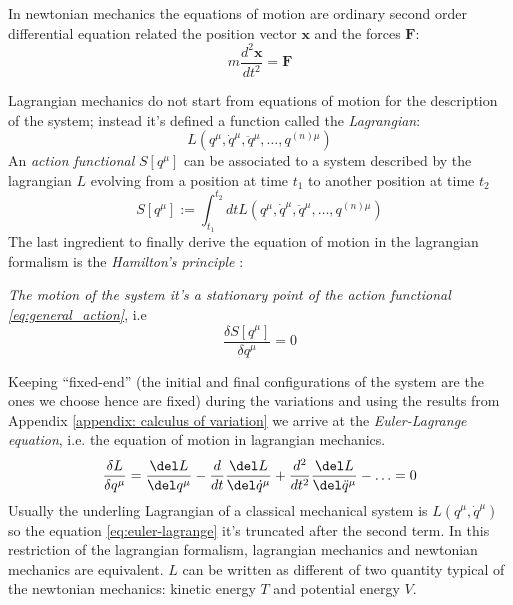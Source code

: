 In newtonian mechanics the equations of motion are ordinary second order differential
equation related the position vector $\bm{x}$ and the forces $\bm{F}$:
\begin{equation*}
    m \frac{d^2\bm{x}}{dt^2} = \bm{F}
\end{equation*}

Lagrangian mechanics do not start from equations of motion for the description of the
system; instead it's defined a function called the \emph{Lagrangian}:
\begin{equation} \label{eq:general_lagrangian}
    L(q^{\mu}, \dot{q}^{\mu}, \ddot{q}^{\mu}, \ldots, q^{(n)\mu})
\end{equation}
An \emph{action functional} $S[q^{\mu}]$ can be associated to a system described by the
lagrangian $L$ evolving from a position at time $t_1$ to another position at time $t_2$
\begin{equation} \label{eq:general_action}
    S[q^{\mu}] := \int_{t_1}^{t_2} dt L(q^{\mu}, \dot{q}^{\mu}, \ddot{q}^{\mu}, \ldots, q^{(n)\mu})
\end{equation}
The last ingredient to finally derive the equation of motion in the lagrangian formalism
is the \emph{Hamilton's principle} \cite{Goldstein11_Ham_principle}:
\begin{displayquote}
    \emph{The motion of the system it's a stationary point of the action functional
    \eqref{eq:general_action}}, i.e
    \begin{equation*}
        \frac{\delta S[q^{\mu}]}{\delta q^{\mu}} = 0
    \end{equation*}
\end{displayquote}
Keeping ``fixed-end'' (the initial and final configurations of the system are the ones
we choose hence are fixed) during the variations and using the results from Appendix
\ref{appendix: calculus of variation} we arrive at the \emph{Euler-Lagrange equation},
i.e. the equation of motion in lagrangian mechanics.
\begin{equation} \label{eq:euler-lagrange}
    \frac{\delta L}{\delta q^{\mu}} =
    \frac{\del L}{\del q^{\mu}} -
    \frac{d}{dt}\frac{\del L}{\del \dot{q}^{\mu}} +
    \frac{d^2}{dt^2}\frac{\del L}{\del \ddot{q}^{\mu}} -
    \ldots = 0
\end{equation}
Usually the underling Lagrangian of a classical mechanical system is $L(q^{\mu},
\dot{q}^{\mu})$ so the equation \eqref{eq:euler-lagrange} it's truncated after the
second term. In this restriction of the lagrangian formalism, lagrangian mechanics and
newtonian mechanics are equivalent. $L$ can be written as different of two quantity typical of
the newtonian mechanics: kinetic energy $T$ and potential energy $V$.
